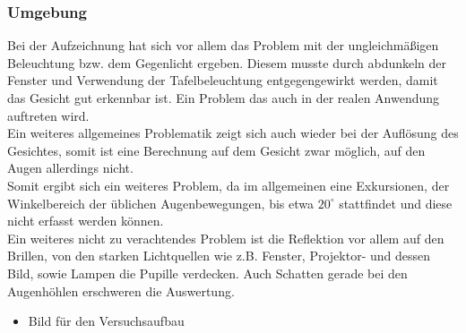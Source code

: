\subsubsection{Umgebung}
Bei der Aufzeichnung hat sich vor allem das Problem mit der ungleichmäßigen Beleuchtung bzw. dem Gegenlicht ergeben. Diesem musste durch abdunkeln der Fenster und Verwendung der Tafelbeleuchtung entgegengewirkt werden, damit das Gesicht gut erkennbar ist. Ein Problem das auch in der realen Anwendung auftreten wird.\\
Ein weiteres allgemeines Problematik zeigt sich auch wieder bei der Auflösung des Gesichtes, somit ist eine Berechnung auf dem Gesicht zwar möglich, auf den Augen allerdings nicht.\\
Somit ergibt sich ein weiteres Problem, da im allgemeinen eine Exkursionen, der Winkelbereich der üblichen Augenbewegungen, bis etwa  $20^\circ$ stattfindet und diese nicht erfasst werden können.\\
Ein weiteres nicht zu verachtendes Problem ist die Reflektion vor allem auf den Brillen, von den starken Lichtquellen wie z.B. Fenster, Projektor- und dessen Bild, sowie Lampen die Pupille verdecken. Auch Schatten gerade bei den Augenhöhlen erschweren die Auswertung. 
\begin{itemize}
	\item Bild für den Versuchsaufbau
\end{itemize}
